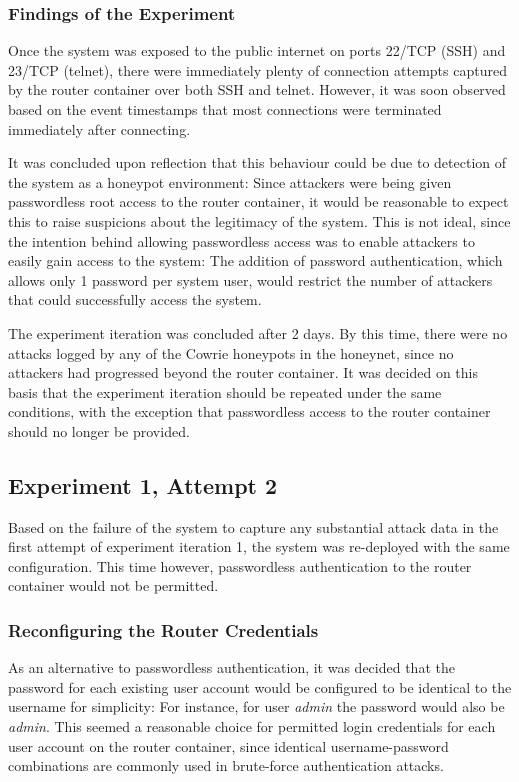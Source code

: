 \subsubsection{Findings of the Experiment}
Once the system was exposed to the public internet on ports 22/TCP (SSH) and 23/TCP (telnet), there were immediately plenty of connection attempts captured by the router container over both SSH and telnet. However, it was soon observed based on the event timestamps that most connections were terminated immediately after connecting. 

It was concluded upon reflection that this behaviour could be due to detection of the system as a honeypot environment: Since attackers were being given passwordless root access to the router container, it would be reasonable to expect this to raise suspicions about the legitimacy of the system. This is not ideal, since the intention behind allowing passwordless access was to enable attackers to easily gain access to the system: The addition of password authentication, which allows only 1 password per system user, would restrict the number of attackers that could successfully access the system.

The experiment iteration was concluded after 2 days. By this time, there were no attacks logged by any of the Cowrie honeypots in the honeynet, since no attackers had progressed beyond the router container. It was decided on this basis that the experiment iteration should be repeated under the same conditions, with the exception that passwordless access to the router container should no longer be provided.

\subsection{Experiment 1, Attempt 2}
Based on the failure of the system to capture any substantial attack data in the first attempt of experiment iteration 1, the system was re-deployed with the same configuration. This time however, passwordless authentication to the router container would not be permitted.

\subsubsection{Reconfiguring the Router Credentials}
As an alternative to passwordless authentication, it was decided that the password for each existing user account would be configured to be identical to the username for simplicity: For instance, for user \textit{admin} the password would also be \textit{admin}. This seemed a reasonable choice for permitted login credentials for each user account on the router container, since identical username-password combinations are commonly used in brute-force authentication attacks.

